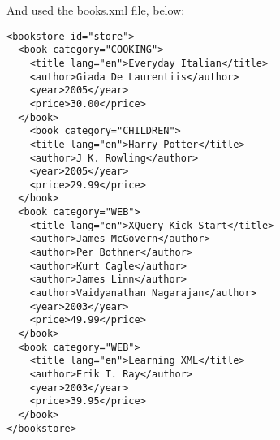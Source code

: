 And used the books.xml file, below: 

\lstset{language=XML}
\begin{lstlisting}
<bookstore id="store">  
  <book category="COOKING">
    <title lang="en">Everyday Italian</title>
    <author>Giada De Laurentiis</author>
    <year>2005</year>
    <price>30.00</price>
  </book>
    <book category="CHILDREN">
    <title lang="en">Harry Potter</title>
    <author>J K. Rowling</author>
    <year>2005</year>
    <price>29.99</price>
  </book>
  <book category="WEB">
    <title lang="en">XQuery Kick Start</title>
    <author>James McGovern</author>
    <author>Per Bothner</author>
    <author>Kurt Cagle</author>
    <author>James Linn</author>
    <author>Vaidyanathan Nagarajan</author>
    <year>2003</year>
    <price>49.99</price>
  </book>
  <book category="WEB">
    <title lang="en">Learning XML</title>
    <author>Erik T. Ray</author>
    <year>2003</year>
    <price>39.95</price>
  </book>
</bookstore> 
\end{lstlisting}

%
